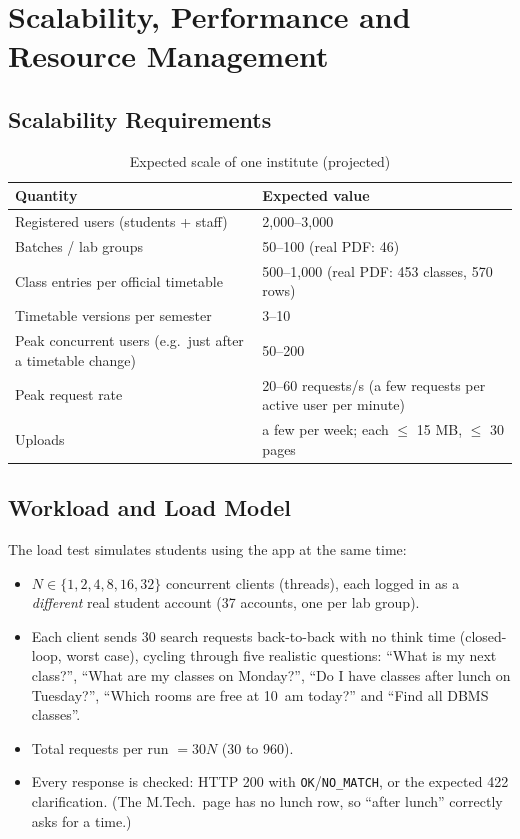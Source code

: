 \section{Scalability, Performance and Resource Management}
\noindent{}

\subsection{Scalability Requirements}
\begin{table}[H]
\centering
\caption{Expected scale of one institute (projected)}
\label{tab:scale}
\small
\begin{tabularx}{\textwidth}{@{}Xp{6cm}@{}}
\toprule
\textbf{Quantity} & \textbf{Expected value}\\
\midrule
Registered users (students + staff) & 2{,}000--3{,}000\\
Batches / lab groups & 50--100 (real PDF: 46)\\
Class entries per official timetable & 500--1{,}000 (real PDF: 453 classes, 570 rows)\\
Timetable versions per semester & 3--10\\
Peak concurrent users (e.g.\ just after a timetable change) & 50--200\\
Peak request rate & 20--60 requests/s (a few requests per active user per minute)\\
Uploads & a few per week; each $\leq$ 15 MB, $\leq$ 30 pages\\
\bottomrule
\end{tabularx}
\end{table}

\subsection{Workload and Load Model}
The load test simulates students using the app at the same time:
\begin{itemize}
\item $N \in \{1, 2, 4, 8, 16, 32\}$ concurrent clients (threads), each logged in as a
      \emph{different} real student account (37 accounts, one per lab group).
\item Each client sends 30 search requests back-to-back with no think time (closed-loop, worst case),
      cycling through five realistic questions: ``What is my next class?'', ``What are my classes on
      Monday?'', ``Do I have classes after lunch on Tuesday?'', ``Which rooms are free at 10~am
      today?'' and ``Find all DBMS classes''.
\item Total requests per run $= 30N$ (30 to 960).
\item Every response is checked: HTTP 200 with \texttt{OK}/\texttt{NO\_MATCH}, or the expected 422
      clarification. (The M.Tech.\ page has no lunch row, so ``after lunch'' correctly asks for a time.)
\end{itemize}

